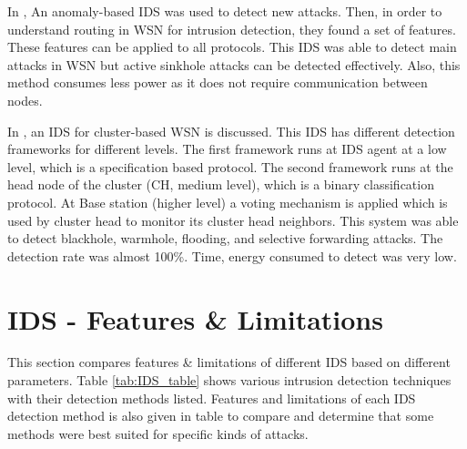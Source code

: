 \documentclass{svproc}
\begin{document}
In \cite{eik2006intrusion}, An anomaly-based IDS was used to detect new attacks. Then, in order to understand routing in WSN for intrusion detection, they found a set of features. These features can be applied to all protocols. This IDS was able to detect main attacks in WSN but active sinkhole attacks can be detected effectively. Also, this method consumes less power as it does not require communication between nodes.\par
In \cite{sedjelmaci2013efficient}, an IDS for cluster-based WSN is discussed. This IDS has different detection frameworks for different levels. The first framework runs at IDS agent at a low level, which is a specification based protocol. The second framework runs at the head node of the cluster (CH, medium level), which is a binary classification protocol. At Base station (higher level) a voting mechanism is applied which is used by cluster head to monitor its cluster head neighbors. This system was able to detect blackhole, warmhole, flooding, and selective forwarding attacks. The detection rate was almost 100\%. Time, energy consumed to detect was very low.\par

\section{IDS - Features \& Limitations}
This section compares features \& limitations of different IDS based on different parameters. Table \ref{tab:IDS_table} shows various intrusion detection techniques with their detection methods listed. Features and limitations of each IDS detection method is also given in table to compare and determine that some methods were best suited for specific kinds of attacks. 
\end{document}
